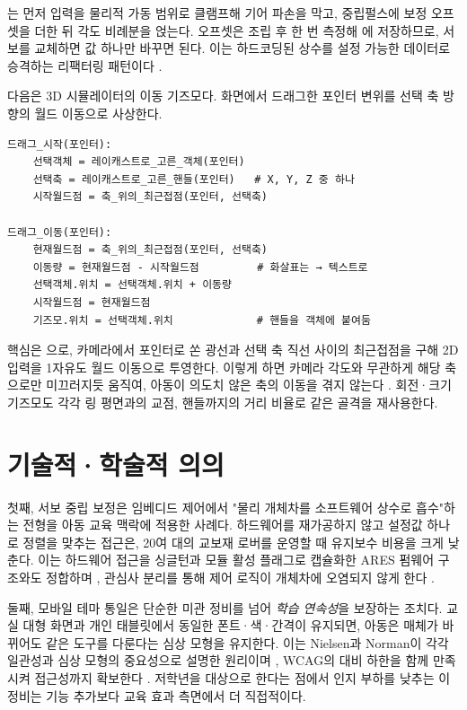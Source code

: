 는 먼저 입력을 물리적 가동 범위로 클램프해 기어 파손을 막고, 중립펄스에 보정 오프셋을 더한 뒤 각도 비례분을 얹는다. 오프셋은 조립 후 한 번 측정해 에 저장하므로, 서보를 교체하면 값 하나만 바꾸면 된다. 이는 하드코딩된 상수를 설정 가능한 데이터로 승격하는 리팩터링 패턴이다 \cite{fowler2018refactoring}.

다음은 3D 시뮬레이터의 이동 기즈모다. 화면에서 드래그한 포인터 변위를 선택 축 방향의 월드 이동으로 사상한다.

\begin{verbatim}
드래그_시작(포인터):
    선택객체 = 레이캐스트로_고른_객체(포인터)
    선택축 = 레이캐스트로_고른_핸들(포인터)   # X, Y, Z 중 하나
    시작월드점 = 축_위의_최근접점(포인터, 선택축)

드래그_이동(포인터):
    현재월드점 = 축_위의_최근접점(포인터, 선택축)
    이동량 = 현재월드점 - 시작월드점         # 화살표는 → 텍스트로
    선택객체.위치 = 선택객체.위치 + 이동량
    시작월드점 = 현재월드점
    기즈모.위치 = 선택객체.위치             # 핸들을 객체에 붙여둠
\end{verbatim}

핵심은 으로, 카메라에서 포인터로 쏜 광선과 선택 축 직선 사이의 최근접점을 구해 2D 입력을 1자유도 월드 이동으로 투영한다. 이렇게 하면 카메라 각도와 무관하게 해당 축으로만 미끄러지듯 움직여, 아동이 의도치 않은 축의 이동을 겪지 않는다 \cite{akenine2018realtime}. 회전·크기 기즈모도 각각 링 평면과의 교점, 핸들까지의 거리 비율로 같은 골격을 재사용한다.

\section{기술적·학술적 의의}

첫째, 서보 중립 보정은 임베디드 제어에서 "물리 개체차를 소프트웨어 상수로 흡수"하는 전형을 아동 교육 맥락에 적용한 사례다. 하드웨어를 재가공하지 않고 설정값 하나로 정렬을 맞추는 접근은, 20여 대의 교보재 로버를 운영할 때 유지보수 비용을 크게 낮춘다. 이는 하드웨어 접근을 싱글턴과 모듈 활성 플래그로 캡슐화한 ARES 펌웨어 구조와도 정합하며 \cite{ares-repo}, 관심사 분리를 통해 제어 로직이 개체차에 오염되지 않게 한다 \cite{martin2008cleancode}.

둘째, 모바일 테마 통일은 단순한 미관 정비를 넘어 \emph{학습 연속성}을 보장하는 조치다. 교실 대형 화면과 개인 태블릿에서 동일한 폰트·색·간격이 유지되면, 아동은 매체가 바뀌어도 같은 도구를 다룬다는 심상 모형을 유지한다. 이는 Nielsen과 Norman이 각각 일관성과 심상 모형의 중요성으로 설명한 원리이며 \cite{nielsen1994heuristics, norman2013design}, WCAG의 대비 하한을 함께 만족시켜 접근성까지 확보한다 \cite{wcag21}. 저학년을 대상으로 한다는 점에서 인지 부하를 낮추는 이 정비는 기능 추가보다 교육 효과 측면에서 더 직접적이다.

